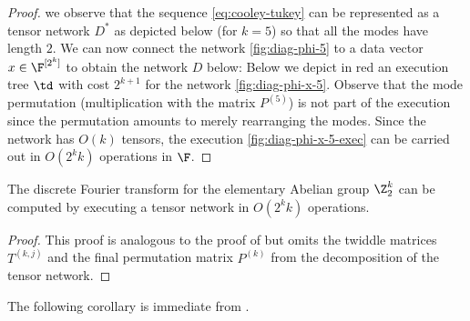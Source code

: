 \begin{proof}
we observe that the sequence \eqref{eq:cooley-tukey}
can be represented as a tensor network $D^*$ as depicted below (for $k=5$)
so that all the modes have length $2$.
We can now connect the network \eqref{fig:diag-phi-5} to a data vector
$x\in\F^{[2^k]}$ to obtain the network $D$ below:
Below we depict in red an execution tree $\td$ with cost $2^{k+1}$
for the network \eqref{fig:diag-phi-x-5}. Observe that the mode
permutation (multiplication with the matrix $P^{(5)}$) is not part of
the execution since the permutation amounts to merely rearranging
the modes.
Since the network has $O(k)$ tensors, the execution
\eqref{fig:diag-phi-x-5-exec} can be carried out in $O(2^kk)$ operations in $\F$.
\end{proof}

\begin{lemma}
\label{lem:fwht}
The discrete Fourier transform for the elementary Abelian group $\Z_{2}^k$ can
be computed by executing a tensor network in $O(2^kk)$ operations.
\end{lemma}
\begin{proof}
This proof is analogous to the proof of  but omits the twiddle matrices
$T^{(k,j)}$ and the final permutation matrix $P^{(k)}$ from the
decomposition of the tensor network.
\end{proof}

The following corollary is immediate from .

